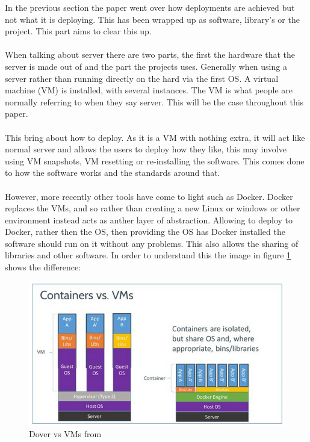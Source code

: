 In the previous section the paper went over how deployments are achieved but not what it is deploying. This has been wrapped up as software, library's or the project. This part aims to clear this up.
\\\\
When talking about server there are two parts, the first the hardware that the server is made out of and the part the projects uses. Generally when using a server rather than running directly on the hard via the first OS. A virtual machine (VM) is installed, with several instances. The VM is what people are normally referring to when they say server. This will be the case throughout this paper.
\\\\
This bring about how to deploy. As it is a VM with nothing extra, it will act like normal server and allows the users to deploy how they like, this may involve using VM snapshots, VM resetting or re-installing the software. This comes done to how the software works and the standards around that. 
\\\\
However, more recently other tools have come to light such as Docker. Docker replaces the VMs, and so rather than creating a new Linux or windows or other environment instead acts as anther layer of abstraction. Allowing to deploy to Docker, rather then the OS, then providing the OS has Docker installed the software should run on it without any problems. This also allows the sharing of libraries and other software. In order to understand this the image in figure \ref{fig:docker-vm} shows the difference:

\begin{figure}[H]
	\centering
	\includegraphics[scale=0.45]{images/docker-vm.png}
	\caption{Dover vs VMs from \cite{docker-vm}}
	\label{fig:docker-vm}
\end{figure}

